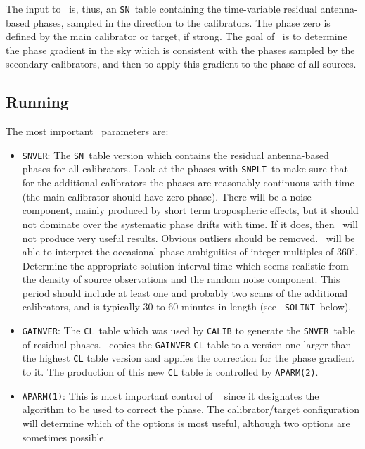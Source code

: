 {    The input to \ATMCA~is, thus, an {\tt SN}~table containing the
time-variable residual antenna-based phases, sampled in the direction
to the calibrators.  The phase zero is defined by the main calibrator
or target, if strong.  The goal of \ATMCA~is to determine the phase
gradient in the sky which is consistent with the phases sampled by the
secondary calibrators, and then to apply this gradient to the phase of
all sources.

\subsection {Running \ATMCA}

    The most important \ATMCA~parameters are:
\begin {itemize}
\item {\tt SNVER}: The {\tt SN}~table version which contains the
residual antenna-based phases for all calibrators.  Look at the phases
with {\tt SNPLT}~to make sure that for the additional calibrators the
phases are reasonably continuous with time (the main calibrator should
have zero phase).  There will be a noise component, mainly produced by
short term tropospheric effects, but it should not dominate over the
systematic phase drifts with time.  If it does, then \ATMCA~will not
produce very useful results.  Obvious outliers should be removed.
\ATMCA~will be able to interpret the occasional phase ambiguities
of integer multiples of $360^\circ$.  Determine the appropriate
solution interval time which seems realistic from the density of
source observations and the random noise component.  This period
should include at least one and probably two scans of the additional
calibrators, and is typically 30 to 60 minutes in length (see {\tt
SOLINT}~below).

\item {\tt GAINVER}: The {\tt CL}~table which was used by {\tt CALIB}
to generate the {\tt SNVER}~table of residual phases.  \ATMCA~copies
the {\tt GAINVER} {\tt CL} table to a version one larger than the
highest {\tt CL} table version and applies the correction for the
phase gradient to it.  The production of this new {\tt CL} table is
controlled by {\tt APARM(2)}.

\item {\tt APARM(1)}: This is most important control of \ATMCA~ since
it designates the algorithm to be used to correct the phase.  The
calibrator/target configuration will determine which of the options is
most useful, although two options are sometimes possible.


\end{itemize}}
